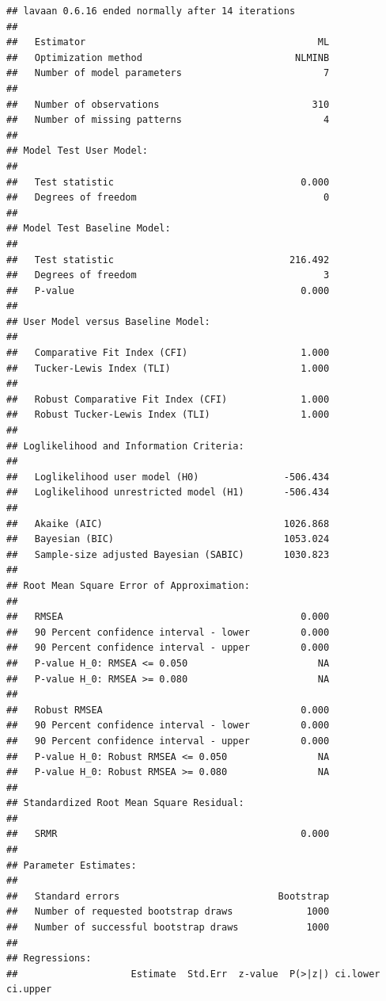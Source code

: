 \documentclass[
  11pt,
]{book}
\begin{document}
\begin{verbatim}
## lavaan 0.6.16 ended normally after 14 iterations
## 
##   Estimator                                         ML
##   Optimization method                           NLMINB
##   Number of model parameters                         7
## 
##   Number of observations                           310
##   Number of missing patterns                         4
## 
## Model Test User Model:
##                                                       
##   Test statistic                                 0.000
##   Degrees of freedom                                 0
## 
## Model Test Baseline Model:
## 
##   Test statistic                               216.492
##   Degrees of freedom                                 3
##   P-value                                        0.000
## 
## User Model versus Baseline Model:
## 
##   Comparative Fit Index (CFI)                    1.000
##   Tucker-Lewis Index (TLI)                       1.000
##                                                       
##   Robust Comparative Fit Index (CFI)             1.000
##   Robust Tucker-Lewis Index (TLI)                1.000
## 
## Loglikelihood and Information Criteria:
## 
##   Loglikelihood user model (H0)               -506.434
##   Loglikelihood unrestricted model (H1)       -506.434
##                                                       
##   Akaike (AIC)                                1026.868
##   Bayesian (BIC)                              1053.024
##   Sample-size adjusted Bayesian (SABIC)       1030.823
## 
## Root Mean Square Error of Approximation:
## 
##   RMSEA                                          0.000
##   90 Percent confidence interval - lower         0.000
##   90 Percent confidence interval - upper         0.000
##   P-value H_0: RMSEA <= 0.050                       NA
##   P-value H_0: RMSEA >= 0.080                       NA
##                                                       
##   Robust RMSEA                                   0.000
##   90 Percent confidence interval - lower         0.000
##   90 Percent confidence interval - upper         0.000
##   P-value H_0: Robust RMSEA <= 0.050                NA
##   P-value H_0: Robust RMSEA >= 0.080                NA
## 
## Standardized Root Mean Square Residual:
## 
##   SRMR                                           0.000
## 
## Parameter Estimates:
## 
##   Standard errors                            Bootstrap
##   Number of requested bootstrap draws             1000
##   Number of successful bootstrap draws            1000
## 
## Regressions:
##                    Estimate  Std.Err  z-value  P(>|z|) ci.lower ci.upper

\end{verbatim}
\end{document}
